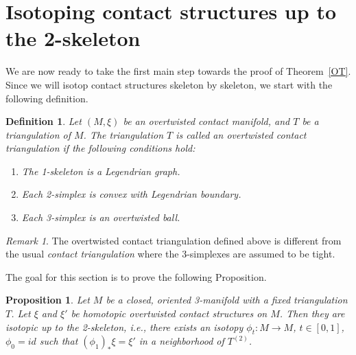 \documentclass[12pt]{amsart}
\newtheorem{prop}[thm]{Proposition}
\newtheorem{defn}[thm]{Definition}
\theoremstyle{remark}
\newtheorem{rmk}[thm]{Remark}
\newcommand{\be}{\begin{enumerate}}
\newcommand{\ee}{\end{enumerate}}
\begin{document}
\section{Isotoping contact structures up to the 2-skeleton}

We are now ready to take the first main step towards the proof of Theorem~\ref{OT}. Since we will isotop contact structures skeleton by skeleton, we start with the following definition.

\begin{defn}
Let $(M,\xi)$ be an overtwisted contact manifold, and $T$ be a triangulation of $M$. The triangulation $T$ is called an {\em overtwisted contact triangulation} if the following conditions hold:
\be
\item{The 1-skeleton is a Legendrian graph.}
\item{Each 2-simplex is convex with Legendrian boundary.}
\item{Each 3-simplex is an overtwisted ball.}
\ee
\end{defn}

\begin{rmk}
The overtwisted contact triangulation defined above is different from the usual {\em contact triangulation} where the 3-simplexes are assumed to be tight.
\end{rmk}

The goal for this section is to prove the following Proposition.

\begin{prop} \label{2skeleton}
Let $M$ be a closed, oriented 3-manifold with a fixed triangulation $T$. Let $\xi$ and $\xi'$ be homotopic overtwisted contact structures on $M$. Then they are isotopic up to the 2-skeleton, i.e., there exists an isotopy $\phi_t:M \to M$, $t \in [0,1]$, $\phi_0=id$ such that $(\phi_1)_*\xi=\xi'$ in a neighborhood of $T^{(2)}$.
\end{prop}
\end{document}

